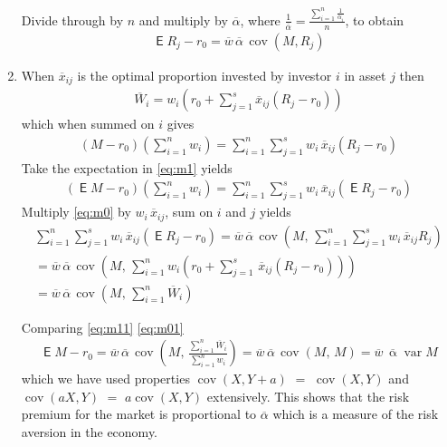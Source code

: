 \documentclass[10pt,handout]{beamer}
\newcommand{\ds}{\displaystyle}
\DeclareMathOperator\expc{\mathsf{E}}
\DeclareMathOperator\var{var}
\DeclareMathOperator\cov{cov}
\theoremstyle{definition}
\begin{document}
\begin{frame}[allowframebreaks]
\begin{enumerate}
      Divide through by $n$ and multiply by $\overline{\alpha}$, where $\ds\frac{1}{\overline{\alpha}} = \frac{\sum_{i=1}^n\frac{1}{\alpha_i}}{n}$, to obtain
      \begin{align}\label{eq:m0}
        \expc{R_j} - r_0 = \overline{w}\,\overline{\alpha}\,\cov(M, R_j)
      \end{align}
    \item When $\overline{x}_{ij}$ is the optimal proportion invested by investor $i$ in asset $j$ then
      \begin{align*}
        \overline{W}_{\!\!i} = w_i\left(r_0 + \sum_{j=1}^s \overline{x}_{ij}(R_j - r_0)\right)
      \end{align*}
      which when summed on $i$ gives
      \begin{align}\label{eq:m1}
        (M - r_0)\left(\sum_{i=1}^n w_i\right) = \sum_{i=1}^n\sum_{j=1}^s w_i\,\overline{x}_{ij}(R_j - r_0)
      \end{align}
    Take the expectation in \eqref{eq:m1} yields
      \begin{align}\label{eq:m11}
        (\expc{M} - r_0)\left(\sum_{i=1}^n w_i\right) = \sum_{i=1}^n\sum_{j=1}^s w_i\,\overline{x}_{ij}(\expc{R_j} - r_0)
      \end{align}
      Multiply \eqref{eq:m0} by $w_i\,\overline{x}_{ij}$, sum on $i$ and $j$ yields
      \begin{multline}\label{eq:m01}
        \sum_{i=1}^n\sum_{j=1}^s w_i\,\overline{x}_{ij}(\expc{R_j} - r_0) = \overline{w}\,\overline{\alpha}\,\cov\left(M,\,\sum_{i=1}^n\sum_{j=1}^s w_i\,\overline{x}_{ij} R_j\right) \\= \overline{w}\,\overline{\alpha}\,\cov\left(M,\,\sum_{i=1}^n w_i\left(r_0 + \sum_{j=1}^s\,\overline{x}_{ij}(R_j - r_0)\right)\right) \\ = \overline{w}\,\overline{\alpha}\,\cov\left(M,\,\sum_{i=1}^n \overline{W}_{\!\!i}\right) 
      \end{multline}

      \vspace{-4mm}
      Comparing \eqref{eq:m11} \eqref{eq:m01} 
      \begin{align*}
        \expc{M} - r_0 = \overline{w}\,\overline{\alpha}\,\cov\left(M,\,\frac{\sum_{i=1}^n \overline{W}_{\!\!i}}{\sum_{i=1}^n w_i}\right) = \overline{w}\,\overline{\alpha}\,\cov\left(M,\,M\right) = \overline{w}\,\overline{\upalpha}\var M
      \end{align*}
      which we have used properties $\cov(X, Y + a)$ $=$ $\cov(X, Y)$ and $\cov(aX, Y)$ $=$ $a\cov(X,Y)$ extensively. This shows that the risk premium for the market is proportional to $\overline{\alpha}$ which is a measure of the risk aversion in the economy.
  \end{enumerate}
\end{frame}
\end{document}
